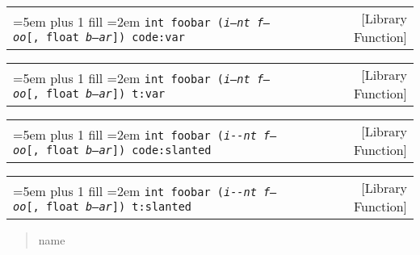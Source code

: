 \documentclass{book}
\newcommand\GNUTexinfocommandstyletextvar[1]{{\normalfont{}\textsl{#1}}}%
\begin{document}
%

\noindent\begin{tabularx}{\linewidth}{@{}Xr}
\rightskip=5em plus 1 fill
\hangindent=2em
\texttt{int foobar (\texttt{\GNUTexinfocommandstyletextvar{i--nt}}\ \GNUTexinfocommandstyletextvar{f---oo}[,\ float\ \GNUTexinfocommandstyletextvar{b--ar}])\ code:var}& [Library Function]
\end{tabularx}

%

\noindent\begin{tabularx}{\linewidth}{@{}Xr}
\rightskip=5em plus 1 fill
\hangindent=2em
\texttt{int foobar (\texttt{\GNUTexinfocommandstyletextvar{i--nt}}\ \GNUTexinfocommandstyletextvar{f---oo}[,\ float\ \GNUTexinfocommandstyletextvar{b--ar}])\ t:var}& [Library Function]
\end{tabularx}

%

\noindent\begin{tabularx}{\linewidth}{@{}Xr}
\rightskip=5em plus 1 fill
\hangindent=2em
\texttt{int foobar (\texttt{\textsl{i{-}{-}nt}}\ \GNUTexinfocommandstyletextvar{f---oo}[,\ float\ \GNUTexinfocommandstyletextvar{b--ar}])\ code:slanted}& [Library Function]
\end{tabularx}

%

\noindent\begin{tabularx}{\linewidth}{@{}Xr}
\rightskip=5em plus 1 fill
\hangindent=2em
\texttt{int foobar (\texttt{\textsl{i{-}{-}nt}}\ \GNUTexinfocommandstyletextvar{f---oo}[,\ float\ \GNUTexinfocommandstyletextvar{b--ar}])\ t:slanted}& [Library Function]
\end{tabularx}

%
\begin{quote}
\unskip{\parskip=0pt\noindent}%
name
\end{quote}
\end{document}
